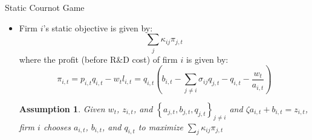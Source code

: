 \documentclass[
  10pt,
  aspectratio=169,   %
]{beamer}
\theoremstyle{plain}
\newtheorem*{assumption*}{Assumption}
\begin{document}
\begin{frame}{Static Cournot Game}
  \label{static_game}
  \begin{itemize}
    \item Firm $i$'s static objective is given by:
          \[
            \sum_{j} \kappa_{ij} \pi_{j,t}
          \] \pause
          where the profit (before R\&D cost) of firm $i$ is given by:
          \[\pi_{i,t} = p_{i,t} q_{i,t} - w_t l_{i,t} = q_{i,t} \left( b_{i,t} - \sum_{j\neq i} \sigma_{ij} q_{j,t} - q_{i,t} - \frac{w_t}{a_{i,t}} \right)\] \pause
          \begin{assumption*}
            Given $w_t$, $z_{i,t}$, and $\left\{a_{j,t}, b_{j,t}, q_{j,t}\right\}_{j\neq i}$ and $\zeta a_{i,t} + b_{i,t} = z_{i,t}$, firm $i$ chooses $a_{i,t}$, $b_{i,t}$, and $q_{i,t}$ to maximize $\sum_{j} \kappa_{ij} \pi_{j,t}$
          \end{assumption*}
  \end{itemize}
\end{frame}


\end{document}
